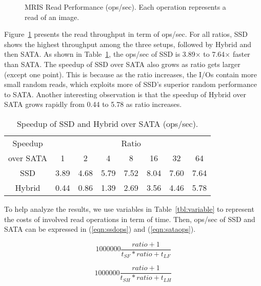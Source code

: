 \begin{figure}[t]
\begin{centering}
\caption{MRIS Read Performance (ops/sec). Each operation represents a
read of an image.}
\label{fig:mrisopssec}
\end{centering}
\end{figure}

Figure~\ref{fig:mrisopssec} presents the read throughput in term of
ops/sec. For all ratios, SSD shows the highest throughput among the
three setups, followed by Hybrid and then SATA. As shown in
Table~\ref{tbl:speedup}, the ops/sec of SSD is 3.89$\times$ to
7.64$\times$ faster than SATA. The speedup of SSD over SATA also grows
as ratio gets larger (except one point). This is because as the ratio
increases, the I/Os contain more small random reads, which exploits
more of SSD's superior random performance to SATA. Another interesting
observation is that the speedup of Hybrid over SATA grows rapidly from
0.44 to 5.78 as ratio increases.

\begin{table}[tc]
{\centering \footnotesize
\begin{tabular}{c|c|c|c|c|c|c|c}
\hline 
  Speedup & \multicolumn{7}{c}{Ratio} \\ \cline{2-8}
  over SATA & 1 & 2 & 4 & 8 & 16 & 32 & 64 \\ \hline
  SSD & 3.89 & 4.68 & 5.79 & 7.52 & 8.04 & 7.60 & 7.64  \\
  Hybrid & 0.44 & 0.86 & 1.39 & 2.69 & 3.56 & 4.46 & 5.78 \\ \hline
\end{tabular}
 \caption{Speedup of SSD and Hybrid over SATA (ops/sec).}
\label{tbl:speedup}
}
\end{table}

To help analyze the results, we use variables in
Table~\ref{tbl:variable} to represent the costs of involved read
operations in term of time. Then, ops/sec of SSD and SATA can be
expressed in (\ref{eqn:ssdops}) and (\ref{eqn:sataops}). 

\begin{equation}
\label{eqn:ssdops}
    1000000 \frac{ratio + 1}{t_{SF} * ratio + t_{LF}}
\end{equation}

\begin{equation}
\label{eqn:sataops}
    1000000 \frac{ratio + 1}{t_{SH} * ratio + t_{LH}}
\end{equation}

